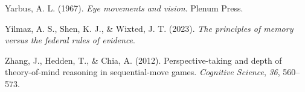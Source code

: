 \documentclass[
]{krantz}
\newlength{\cslhangindent}
\newenvironment{CSLReferences}[2] %
 {\begin{list}{}{%
  \setlength{\itemindent}{0pt}
  \setlength{\leftmargin}{0pt}
  \setlength{\parsep}{0pt}
  \ifodd #1
   \setlength{\leftmargin}{\cslhangindent}
   \setlength{\itemindent}{-1\cslhangindent}
  \fi
  \setlength{\itemsep}{#2\baselineskip}}}
 {\end{list}}
\begin{document}
\begin{CSLReferences}{1}{0}
Yarbus, A. L. (1967). \emph{Eye movements and vision}. Plenum Press.

Yilmaz, A. S., Shen, K. J., \& Wixted, J. T. (2023). \emph{The principles of memory versus the federal rules of evidence}.

Zhang, J., Hedden, T., \& Chia, A. (2012). Perspective-taking and depth of theory-of-mind reasoning in sequential-move games. \emph{Cognitive Science}, \emph{36}, 560--573.

\end{CSLReferences}
\end{document}

